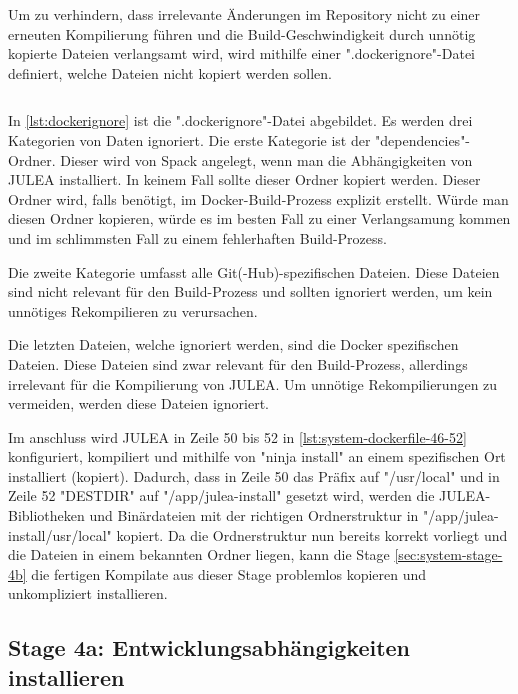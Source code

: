Um zu verhindern, dass irrelevante Änderungen im Repository nicht zu einer erneuten Kompilierung führen und die Build-Geschwindigkeit durch unnötig kopierte Dateien verlangsamt wird, wird mithilfe einer ".dockerignore"-Datei definiert, welche Dateien nicht kopiert werden sollen.

\begin{listing}[H]
    \inputminted{text}{./code-examples/.dockerignore}
    \caption{Dockerignore-Datei}
    \label{lst:dockerignore}
\end{listing}

In \cref{lst:dockerignore} ist die ".dockerignore"-Datei abgebildet. Es werden drei Kategorien von Daten ignoriert. Die erste Kategorie ist der "dependencies"-Ordner. Dieser wird von Spack angelegt, wenn man die Abhängigkeiten von JULEA installiert. In keinem Fall sollte dieser Ordner kopiert werden. Dieser Ordner wird, falls benötigt, im Docker-Build-Prozess explizit erstellt. Würde man diesen Ordner kopieren, würde es im besten Fall zu einer Verlangsamung kommen und im schlimmsten Fall zu einem fehlerhaften Build-Prozess.

Die zweite Kategorie umfasst alle Git(-Hub)-spezifischen Dateien. Diese Dateien sind nicht relevant für den Build-Prozess und sollten ignoriert werden, um kein unnötiges Rekompilieren zu verursachen.

Die letzten Dateien, welche ignoriert werden, sind die Docker spezifischen Dateien. Diese Dateien sind zwar relevant für den Build-Prozess, allerdings irrelevant für die Kompilierung von JULEA. Um unnötige Rekompilierungen zu vermeiden, werden diese Dateien ignoriert.

Im anschluss wird JULEA in Zeile 50 bis 52 in \cref{lst:system-dockerfile-46-52} konfiguriert, kompiliert und mithilfe von "ninja install" an einem spezifischen Ort installiert (kopiert). Dadurch, dass in Zeile 50 das Präfix auf "/usr/local" und in Zeile 52 "DESTDIR" auf "/app/julea-install" gesetzt wird, werden die JULEA-Bibliotheken und Binärdateien mit der richtigen Ordnerstruktur in "/app/julea-install/usr/local" kopiert. Da die Ordnerstruktur nun bereits korrekt vorliegt und die Dateien in einem bekannten Ordner liegen, kann die Stage \cref{sec:system-stage-4b} die fertigen Kompilate aus dieser Stage problemlos kopieren und unkompliziert installieren.

\subsection{Stage 4a: Entwicklungsabhängigkeiten installieren} \label{sec:system-stage-4a}

